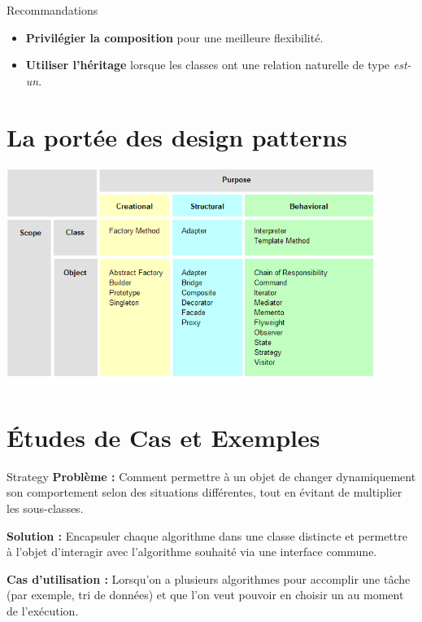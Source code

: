 \documentclass[aspectratio=169]{beamer}
\begin{document}
\begin{frame}{Recommandations}
    \begin{itemize}
        \item \textbf{Privilégier la composition} pour une meilleure flexibilité.
        \item \textbf{Utiliser l'héritage} lorsque les classes ont une relation naturelle de type \textit{est-un}.
    \end{itemize}
\end{frame}


\section{La portée des design patterns}
\begin{frame}
    \centering
    \includegraphics[width=0.9\textwidth]{pic/porte_design_pattern.png}
\end{frame}

\section{Études de Cas et Exemples}
\begin{frame}{Strategy}
    \textbf{Problème :} 
    Comment permettre à un objet de changer dynamiquement son comportement selon des situations différentes, tout en évitant de multiplier les sous-classes.

    \textbf{Solution :} 
    Encapsuler chaque algorithme dans une classe distincte et permettre à l'objet d'interagir avec l'algorithme souhaité via une interface commune.

    \textbf{Cas d'utilisation :}
    Lorsqu'on a plusieurs algorithmes pour accomplir une tâche (par exemple, tri de données) et que l'on veut pouvoir en choisir un au moment de l'exécution.
\end{frame}
\end{document}
